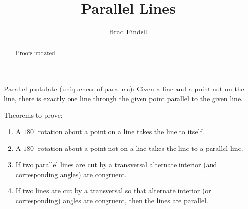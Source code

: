 \documentclass[nooutcomes]{ximera}
\title{Parallel Lines}
\author{Brad Findell}
\begin{document}
\begin{abstract}
Proofs updated. 
\end{abstract}
\maketitle

Parallel postulate (uniqueness of parallels):  Given a line and a point not on the line, there is exactly one line through the given point parallel to the given line.  

Theorems to prove: 
\begin{enumerate}
\item A $180^\circ$ rotation about a point on a line takes the line to itself. 
\item A $180^\circ$ rotation about a point not on a line takes the line to a parallel line.
\item If two parallel lines are cut by a transversal alternate interior (and corresponding angles) are congruent.
\item If two lines are cut by a transversal so that alternate interior (or  corresponding) angles are congruent, then the lines are parallel. 
\end{enumerate}
\end{document}

